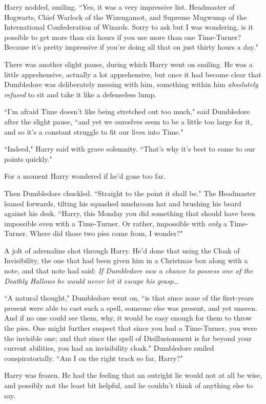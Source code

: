 Harry nodded, smiling. ``Yes, it was a very impressive list. Headmaster of Hogwarts, Chief Warlock of the Wizengamot, and Supreme Mugwump of the International Confederation of Wizards. Sorry to ask but I was wondering, is it possible to get more than six hours if you use more than one Time-Turner? Because it's pretty impressive if you're doing all that on just thirty hours a day."

There was another slight pause, during which Harry went on smiling. He was a little apprehensive, actually a lot apprehensive, but once it had become clear that Dumbledore was deliberately messing with him, something within him \emph{absolutely refused} to sit and take it like a defenseless lump.

``I'm afraid Time doesn't like being stretched out too much," said Dumbledore after the slight pause, ``and yet we ourselves seem to be a little too large for it, and so it's a constant struggle to fit our lives into Time."

``Indeed," Harry said with grave solemnity. ``That's why it's best to come to our points quickly."

For a moment Harry wondered if he'd gone too far.

Then Dumbledore chuckled. ``Straight to the point it shall be." The Headmaster leaned forwards, tilting his squashed mushroom hat and brushing his beard against his desk. ``Harry, this Monday you did something that should have been impossible even with a Time-Turner. Or rather, impossible with \emph{only} a Time-Turner. Where did those two pies come from, I wonder?"

A jolt of adrenaline shot through Harry. He'd done that using the Cloak of Invisibility, the one that had been given him in a Christmas box along with a note, and that note had said: \emph{If Dumbledore saw a chance to possess one of the Deathly Hallows he would never let it escape his grasp{\ldots}}

``A natural thought," Dumbledore went on, ``is that since none of the first-years present were able to cast such a spell, someone else was present, and yet unseen. And if no one could see them, why, it would be easy enough for them to throw the pies. One might further suspect that since you had a Time-Turner, you were the invisible one; and that since the spell of Disillusionment is far beyond your current abilities, you had an invisibility cloak." Dumbledore smiled conspiratorially. ``Am I on the right track so far, Harry?"

Harry was frozen. He had the feeling that an outright lie would not at all be wise, and possibly not the least bit helpful, and he couldn't think of anything else to say.

